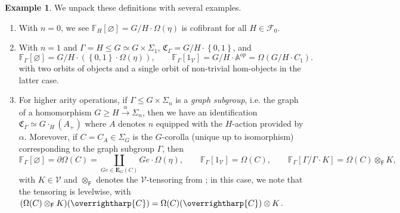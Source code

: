 \documentclass[a4paper,10pt
,draft
]{article}%
\numberwithin{equation}{section}
\numberwithin{figure}{section}
\theoremstyle{definition} %
\newtheorem{example}[equation]{Example}%
\newcommand{\set}[1]{\left\{#1\right\}}%
\newcommand{\vect}[1]{\text{\overrightharp{\ensuremath{#1}}}}
\newcommand{\Fin}{\mathsf{F}}%
\newcommand{\V}{\ensuremath{\mathcal V}}
\newcommand{\1}{\ensuremath{\mathbbm 1}}%
\begin{document}
\begin{example}
      \label{FREEOP_EX}
      We unpack these definitions with several examples.
      \begin{enumerate}[label = (\roman*)]
      \item With $n = 0$, we see $\mathbb F_H[\varnothing] = G/H \cdot \Omega(\eta)$ is cofibrant for all $H \in \mathcal F_0$.
      \item With $n = 1$ and $\Gamma = H \leq G \simeq G \times \Sigma_1$, $\mathfrak C_\Gamma = G/H \cdot \set{0,1}$, and
            \[
                  \mathbb F_{\Gamma}[\varnothing] = G/H \cdot (\set{0,1} \cdot \Omega(\eta)),
                  \qquad
                  \mathbb F_{\Gamma}[1_\V] = G/H \cdot \mathbb A^{op} = \Omega(G/H \cdot C_1).
            \]
            with two orbits of objects and a single orbit of non-trivial hom-objects in the latter case.
      \item For higher arity operations,
            if $\Gamma \leq G \times \Sigma_n$ is a \textit{graph subgroup}, i.e. the graph of a homomorphism $G \geq H \xrightarrow{\alpha} \Sigma_n$, then
            we have an identification $\mathfrak C_{\Gamma} \simeq G \cdot_H (A_+)$ where $A$ denotes $n$ equipped with the $H$-action provided by $\alpha$.
            Morevover, if $C = C_A \in \Sigma_G$ is the $G$-corolla (unique up to isomorphism) corresponding to the graph subgroup $\Gamma$, then
            \[
                  \mathbb F_\Gamma[\varnothing] = \partial\Omega(C) = \coprod_{Ge \in \boldsymbol{E}_G(C)} Ge \cdot \Omega(\eta),
                  \qquad
                  \mathbb F_{\Gamma}[1_\V] = \Omega(C),
                  \qquad
                  \mathbb F_\Gamma[\Gamma/\Gamma \cdot K] = \Omega(C) \otimes_\Fin K,
            \]
            with $K \in \V$ and $\otimes_\Fin$ denotes the $\V$-tensoring from \cite[Example \ref{TAS-TENS_EX}]{BP_TAS};
            in this case, we note that the tensoring is levelwise, with
            $(\Omega(C) \otimes_\Fin K)(\vect C) = \Omega(C)(\vect C) \otimes K$.            
            

\end{enumerate}
\end{example}
\end{document}
